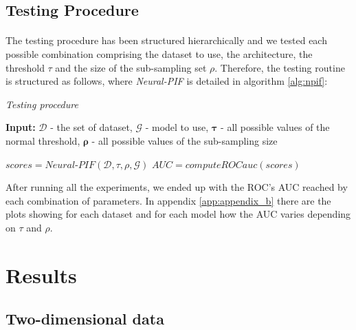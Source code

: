 \subsection{Testing Procedure}
\paragraph{}
The testing procedure has been structured hierarchically and we tested each possible combination comprising the dataset to use, the architecture, the threshold $\tau$ and the size of the sub-sampling set $\rho$. \newline
Therefore, the testing routine is structured as follows, where \textit{Neural-PIF} is detailed in algorithm \ref{alg:npif}:

\begin{algorithm}[h!]
    \caption{\textit{Testing procedure}}
    \label{alg:testing}
    \textbf{Input:} $\bm{\mathcal{D}}$ - the set of dataset, $\mathcal{G}$ - model to use, $\bm{\tau}$ - all possible values of the normal threshold,  $\bm{\rho}$ - all possible values of the sub-sampling size \\
    \begin{algorithmic}[1]
            \ForAll{$\tau \in \bm{\tau}$}
                \ForAll{$\rho \in \bm{\rho}$}
                    \State $scores = \textit{Neural-PIF}(\mathcal{D}, \tau, \rho, \mathcal{G})$
                    \State $AUC = \textit{computeROCauc}(scores)$
                \EndFor
            \EndFor
        \EndFor
    \end{algorithmic}
\end{algorithm}

After running all the experiments, we ended up with the ROC's AUC reached by each combination of parameters. In appendix \ref{app:appendix_b} there are the plots showing for each dataset and for each model how the AUC varies depending on $\tau$ and $\rho$.

\section{Results}
\subsection{Two-dimensional data}

